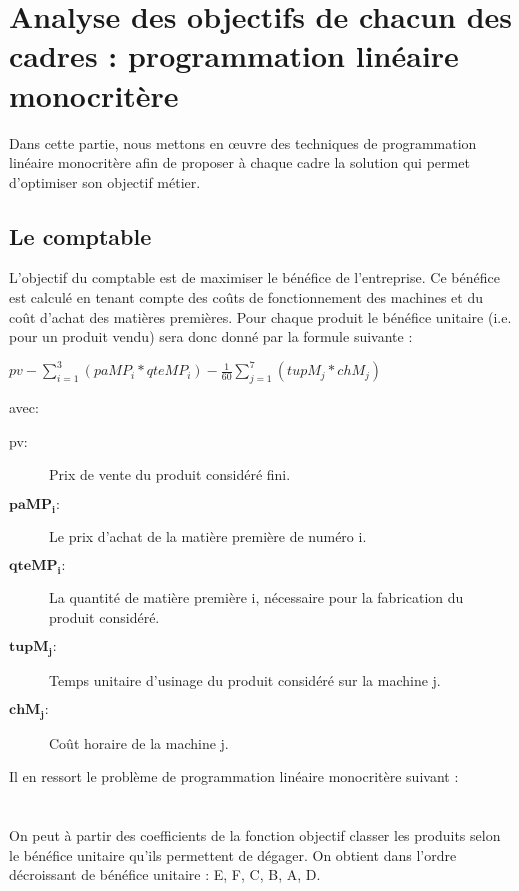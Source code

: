 \documentclass[12pt]{article}
\begin{document}
\section{Analyse des objectifs de chacun des cadres : programmation linéaire monocritère}
Dans cette partie, nous mettons en œuvre des techniques de programmation linéaire monocritère afin de proposer à chaque cadre la solution qui permet d'optimiser son objectif métier.
\subsection{Le comptable}
L'objectif du comptable est de maximiser le bénéfice de l'entreprise. Ce bénéfice est calculé en tenant compte des coûts de fonctionnement des machines et du coût d'achat des matières premières. Pour chaque produit le bénéfice unitaire (i.e. pour un produit vendu) sera donc donné par la formule suivante : \begin{center} $pv - \sum_{i=1}^{3}(paMP_{i} * qteMP_{i}) - \frac{1}{60} \sum_{j=1}^{7}(tupM_{j} * chM_{j}) $ \end{center} avec:
\begin{description}
\item[pv: ]Prix de vente du produit considéré fini.
\item[$\mathbf{paMP_{i} :}$] Le prix d'achat de la matière première de numéro i.
\item[$\mathbf{qteMP_{i} :}$] La quantité de matière première i, nécessaire pour la fabrication du produit considéré.
\item[$\mathbf{tupM_{j} :}$] Temps unitaire d'usinage du produit considéré sur la machine j.
\item[$\mathbf{chM_{j} :}$] Coût horaire de la machine j.
\end{description}
Il en ressort le problème de programmation linéaire monocritère suivant : \newline 
\\
\noindent{}
\\
\\
On peut à partir des coefficients de la fonction objectif classer les produits selon le bénéfice unitaire qu'ils permettent de dégager. On obtient dans l'ordre décroissant de bénéfice unitaire : E, F, C, B, A, D.
\end{document}
